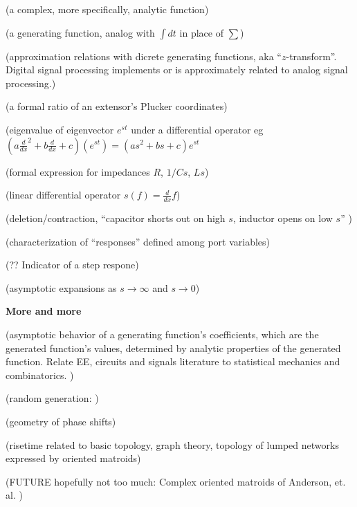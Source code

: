 \documentclass{article}
\begin{document}
(a complex, more specifically, analytic function)

(a generating function, analog with $\int dt$ in place of $\sum$)

(approximation relations with dicrete generating functions, 
aka ``$z$-transform''. Digital signal processing implements or
is approximately related to analog signal processing.)

(a formal ratio of an extensor's Plucker coordinates)

(eigenvalue of eigenvector $e^{s t}$ under a differential operator eg 
$(a\frac{d}{dx}^2 + b\frac{d}{dx} + c)(e^{st}) = (as^2 +bs + c)e^{st}$

(formal expression for impedances $R$, $1/Cs$, $Ls$)

(linear differential operator $s(f) = \frac{d}{dx}f$)

(deletion/contraction, 
``capacitor shorts out on high $s$, inductor opens on low $s$'' 
\cite{intuitAna})

(characterization of ``responses'' defined among port variables)

(?? Indicator of a step respone)

(asymptotic expansions as $s\rightarrow\infty$
and $s\rightarrow 0$)

\noindent\textbf{More and more}

(asymptotic behavior of a generating function's coefficients, which are
the generated function's values, determined by analytic properties of the
generated function.  Relate EE, circuits and signals literature to 
statistical mechanics and combinatorics.  
\cite{statMechForGraphers,multivarHalfPlane,AnalyticCombinatoricsBook})

(random generation: \cite{BoltzmanSampRandCombGen})

(geometry of phase shifts)

(risetime related to basic topology, graph theory, topology of lumped
networks expressed by oriented matroids)

(FUTURE hopefully not too much: Complex oriented matroids of Anderson, et.
al. \cite{complexOM})




{}

\end{document}
